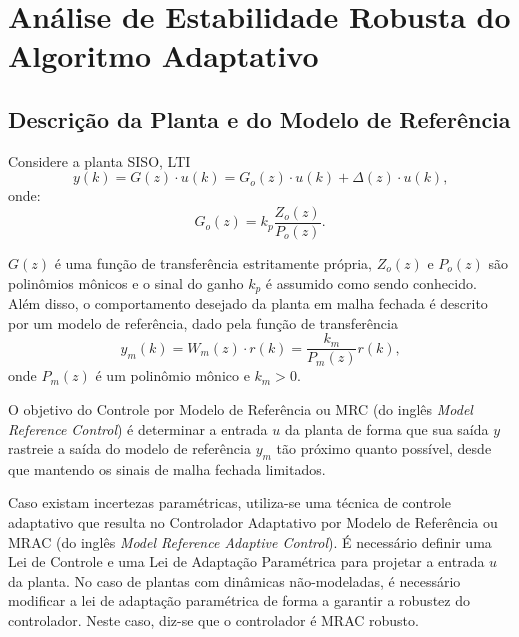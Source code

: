 
\chapter{Análise de Estabilidade Robusta do Algoritmo Adaptativo}\label{provas}


\section{Descrição da Planta e do Modelo de Referência}

  Considere a planta SISO, LTI
  \begin{equation}
    y(k) = G(z) \cdot u(k) = G_o(z) \cdot u(k) + \Delta(z) \cdot u(k)\text{,}
    \label{eq:saida_da_planta}
  \end{equation}
  onde:
  \begin{equation}
    G_o(z) = k_p \frac{Z_o(z)}{P_o(z)}\text{.}
  \end{equation}

  $G(z)$ é uma função de transferência estritamente própria, $Z_o(z)$ e $P_o(z)$ são polinômios mônicos e o sinal do ganho $k_p$ é assumido como sendo conhecido. Além disso, o comportamento desejado da planta em malha fechada é descrito por um modelo de referência, dado pela função de transferência
  \begin{equation}
    y_m(k) = W_m(z) \cdot r(k) = \frac{k_m}{P_m(z)} r(k)\text{,}
    \label{eq:saida_do_modelo_de_referencia}
  \end{equation}
  onde $P_m(z)$ é um polinômio mônico e $k_m > 0$.

  O objetivo do Controle por Modelo de Referência ou MRC (do inglês \emph{Model Reference Control}) é determinar a entrada $u$ da planta de forma que sua saída $y$ rastreie a saída do modelo de referência $y_m$ tão próximo quanto possível, desde que mantendo os sinais de malha fechada limitados.


  Caso existam incertezas paramétricas, utiliza-se uma técnica de controle adaptativo que resulta no Controlador Adaptativo por Modelo de Referência ou MRAC (do inglês \emph{Model Reference Adaptive Control}). É necessário definir uma Lei de Controle e uma Lei de Adaptação Paramétrica para projetar a entrada $u$ da planta. No caso de plantas com dinâmicas não-modeladas, é necessário modificar a lei de adaptação paramétrica de forma a garantir a robustez do controlador. Neste caso, diz-se que o controlador é MRAC robusto.

